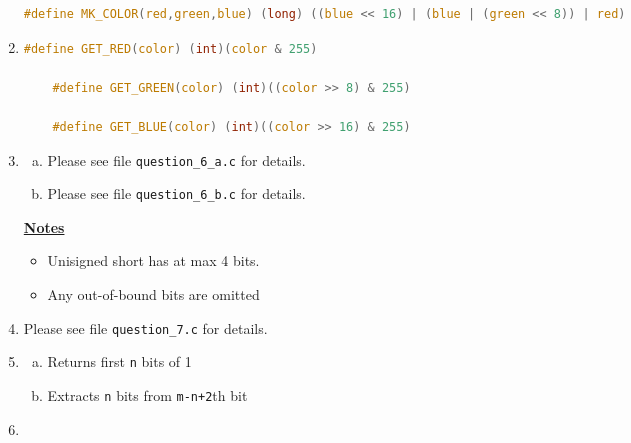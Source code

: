 \documentclass[12pt]{article}
\begin{document}
\begin{enumerate}[1.]
\begin{lstlisting}[language=c]
    #define MK_COLOR(red,green,blue) (long) ((blue << 16) | (blue | (green << 8)) | red)
\end{lstlisting}

    \item

\begin{lstlisting}[language=c]
    #define GET_RED(color) (int)(color & 255)

    #define GET_GREEN(color) (int)((color >> 8) & 255)

    #define GET_BLUE(color) (int)((color >> 16) & 255)
\end{lstlisting}

    \item

    \begin{enumerate}[a)]

        \item

        Please see file \texttt{question\_6\_a.c} for details.

        \item

        Please see file \texttt{question\_6\_b.c} for details.

    \end{enumerate}

    \bigskip

    \underline{\textbf{Notes}}

    \begin{itemize}
        \item Unisigned short has at max 4 bits.
        \item Any out-of-bound bits are omitted
    \end{itemize}

    \item

    Please see file \texttt{question\_7.c} for details.

    \item

    \begin{enumerate}[a)]
        \item Returns first \texttt{n} bits of 1
        \item Extracts \texttt{n} bits from \texttt{m-n+2}th bit
    \end{enumerate}

    \item


\end{enumerate}
\end{document}
